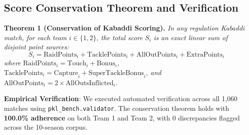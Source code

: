\documentclass[11pt,a4paper]{article}
\begin{document}
\begin{table}[t]
\centering
\small
\caption{\textbf{PKL-Bench Dataset Tier Statistics Across Seasons 1--10.}}
\label{tab:dataset_summary}
\end{table}

\subsection{Score Conservation Theorem and Verification}
\textbf{Theorem 1 (Conservation of Kabaddi Scoring).} \textit{In any regulation Kabaddi match, for each team $i \in \{1, 2\}$, the total score $S_i$ is an exact linear sum of disjoint point sources:}
\begin{equation}
S_i = \text{RaidPoints}_i + \text{TacklePoints}_i + \text{AllOutPoints}_i + \text{ExtraPoints}_i
\end{equation}
\textit{where $\text{RaidPoints}_i = \text{Touch}_i + \text{Bonus}_i$, $\text{TacklePoints}_i = \text{Capture}_i + \text{SuperTackleBonus}_i$, and $\text{AllOutPoints}_i = 2 \times \text{AllOutsInflicted}_i$.}

\textbf{Empirical Verification}: We executed automated verification across all 1,060 matches using \texttt{pkl\_bench.validator}. The conservation theorem holds with \textbf{100.0\% adherence} on both Team 1 and Team 2, with 0 discrepancies flagged across the 10-season corpus.
\end{document}
